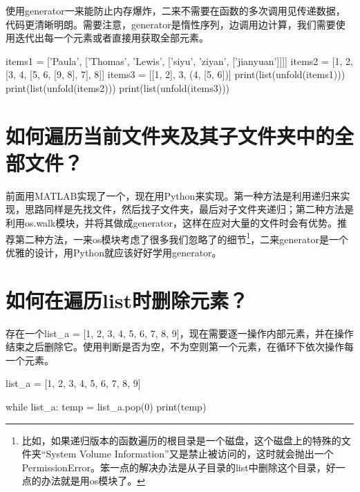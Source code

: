 使用generator一来能防止内存爆炸，二来不需要在函数的多次调用见传递数据，代码更清晰明朗。需要注意，generator是惰性序列，边调用边计算，我们需要使用迭代出每一个元素或者直接用获取全部元素。

\begin{pythoncode}
items1 = ['Paula', ['Thomas', 'Lewis', ['siyu', 'ziyan', ['jianyuan']]]]
items2 = [1, 2, [3, 4, [5, 6, [9, 8], 7], 8]]
items3 = [[1, 2], 3, (4, [5, 6])]
print(list(unfold(items1)))
print(list(unfold(items2)))
print(list(unfold(items3)))
\end{pythoncode}

\section{如何遍历当前文件夹及其子文件夹中的全部文件？}

前面用MATLAB实现了一个，现在用Python来实现。第一种方法是利用递归来实现，思路同样是先找文件，然后找子文件夹，最后对子文件夹递归；第二种方法是利用os.walk模块，并将其做成generator，这样在应对大量的文件时会有优势。推荐第二种方法，一来os模块考虑了很多我们忽略了的细节\footnote{比如，如果递归版本的函数遍历的根目录是一个磁盘，这个磁盘上的特殊的文件夹“System Volume Information”又是禁止被访问的，这时就会抛出一个PermissionError。笨一点的解决办法是从子目录的list中删除这个目录，好一点的办法就是用os模块了。}，二来generator是一个优雅的设计，用Python就应该好好学用generator。


\section{如何在遍历list时删除元素？}

存在一个list\_a = [1, 2, 3, 4, 5, 6, 7, 8, 9]，现在需要逐一操作内部元素，并在操作结束之后删除它。使用判断是否为空，不为空则第一个元素，在循环下依次操作每一个元素。

\begin{pythoncode}
list_a = [1, 2, 3, 4, 5, 6, 7, 8, 9]

while list_a:
    temp = list_a.pop(0)
    print(temp)
\end{pythoncode}



